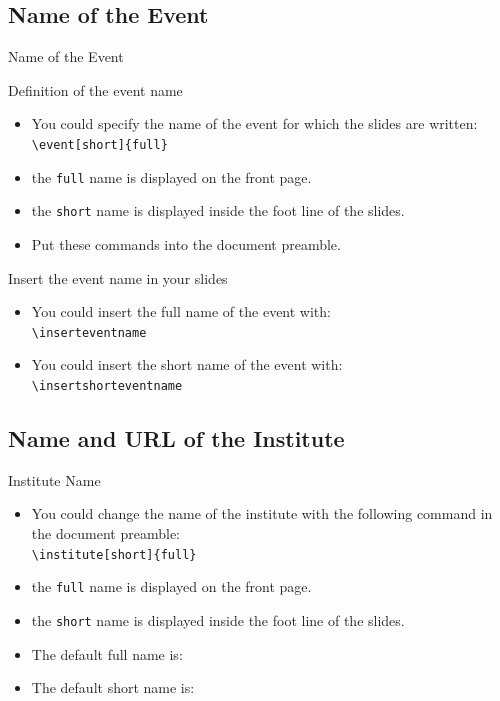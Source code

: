 \documentclass[english,sectioncirclenumberstyle]{ciadbeamer}
\begin{document}
\subsection{Name of the Event}

\begin{frame}[t]{Name of the Event}
	\begin{block}{Definition of the event name}
		\begin{itemize}
		\item You could specify the name of the event for which the slides are written: \\
			\texttt{{\textbackslash}event[short]\{full\}}
		\item the \texttt{full} name is displayed on the front page.
		\item the \texttt{short} name is displayed inside the foot line of the slides.
		\item Put these commands into the document preamble.
		\end{itemize}
	\end{block}
	\begin{block}{Insert the event name in your slides}
		\begin{itemize}
		\item You could insert the full name of the event with: \\
			\texttt{{\textbackslash}inserteventname}
		\item You could insert the short name of the event with: \\
			\texttt{{\textbackslash}insertshorteventname}
		\end{itemize}
	\end{block}
\end{frame}

\subsection{Name and URL of the Institute}

\begin{frame}{Institute Name}
	\begin{itemize}
	\item You could change the name of the institute with the following command in the document preamble: \\
		\texttt{{\textbackslash}institute[short]\{full\}}
	\item the \texttt{full} name is displayed on the front page.
	\item the \texttt{short} name is displayed inside the foot line of the slides.
	\vspace{1em}
	\item The default full name is: \\
		{\smaller\insertinstitute}
	\item The default short name is: \insertshortinstitute
	\end{itemize}
\end{frame}
\end{document}
